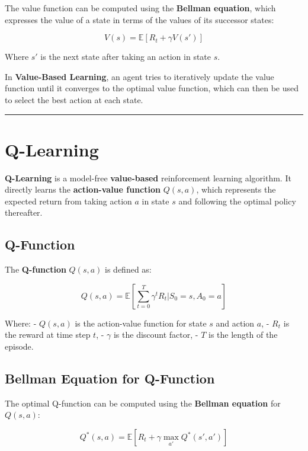 \documentclass[
]{book}
\begin{document}
The value function can be computed using the \textbf{Bellman equation}, which expresses the value of a state in terms of the values of its successor states:

\[
V(s) = \mathbb{E} \left[ R_t + \gamma V(s') \right]
\]

Where \(s'\) is the next state after taking an action in state \(s\).

In \textbf{Value-Based Learning}, an agent tries to iteratively update the value function until it converges to the optimal value function, which can then be used to select the best action at each state.

\begin{center}\rule{0.5\linewidth}{0.5pt}\end{center}

\section{Q-Learning}\label{q-learning-1}

\textbf{Q-Learning} is a model-free \textbf{value-based} reinforcement learning algorithm. It directly learns the \textbf{action-value function} \(Q(s, a)\), which represents the expected return from taking action \(a\) in state \(s\) and following the optimal policy thereafter.

\subsection{Q-Function}\label{q-function}

The \textbf{Q-function} \(Q(s, a)\) is defined as:

\[
Q(s, a) = \mathbb{E} \left[ \sum_{t=0}^{T} \gamma^t R_t | S_0 = s, A_0 = a \right]
\]

Where:
- \(Q(s, a)\) is the action-value function for state \(s\) and action \(a\),
- \(R_t\) is the reward at time step \(t\),
- \(\gamma\) is the discount factor,
- \(T\) is the length of the episode.

\subsection{Bellman Equation for Q-Function}\label{bellman-equation-for-q-function}

The optimal Q-function can be computed using the \textbf{Bellman equation} for \(Q(s, a)\):

\[
Q^*(s, a) = \mathbb{E} \left[ R_t + \gamma \max_{a'} Q^*(s', a') \right]
\]
\end{document}
